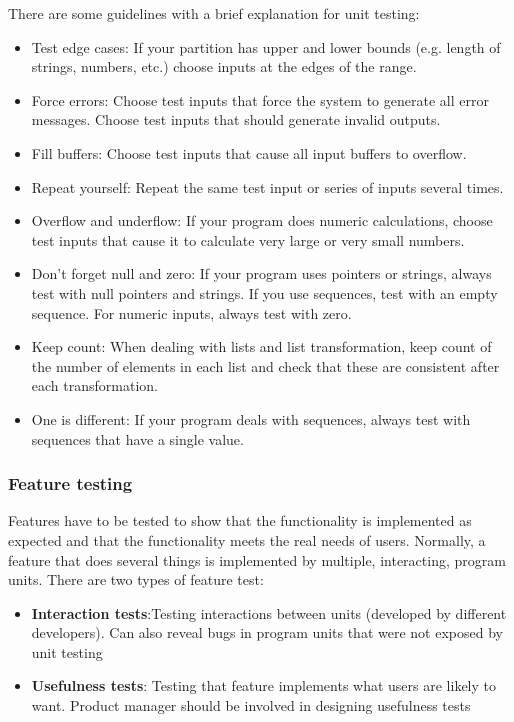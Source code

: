 \documentclass[10pt,a4paper]{report}
\begin{document}
There are some guidelines with a brief explanation for unit testing:
\begin{itemize}
	\item Test edge cases: If your partition has upper and lower bounds (e.g. length of strings, numbers, etc.)
	choose inputs at the edges of the range.
	\item Force errors:	Choose test inputs that force the system to generate all error messages. Choose
	test inputs that should generate invalid outputs.
	\item Fill buffers:	Choose test inputs that cause all input buffers to overflow.
	\item Repeat yourself: Repeat the same test input or series of inputs several times.
	\item Overflow and underflow: If your program does numeric calculations, choose test inputs that cause it to
	calculate very large or very small numbers.
	\item Don’t forget null and zero: If your program uses pointers or strings, always test with null pointers and strings.
	If you use sequences, test with an empty sequence. For numeric inputs, always
	test with zero.
	\item Keep count: When dealing with lists and list transformation, keep count of the number of
	elements in each list and check that these are consistent after each
	transformation.
	\item One is different: If your program deals with sequences, always test with sequences that have a
	single value.
\end{itemize}

\subsubsection{Feature testing}
 Features have to be tested to show that the functionality is implemented as expected and that the functionality meets the real needs of users. Normally, a feature that does several things is implemented by multiple,  interacting, program units.
 There are two types of feature test:
 \begin{itemize}
	\item \textbf{Interaction tests}:Testing interactions between units (developed by different developers). Can also reveal bugs in program units that were not exposed by unit testing
	
	\item \textbf{Usefulness tests}: Testing that feature implements what users are likely to want. Product manager should be involved in designing usefulness tests
 \end{itemize}
\end{document}
